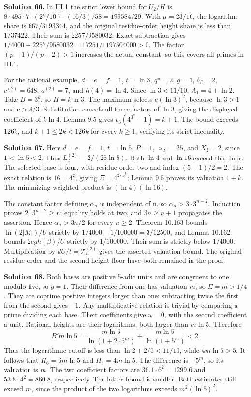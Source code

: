 \documentclass[
  11pt,
  a4paper,
]{article}
\begin{document}
\textbf{Solution 66.} In III.1 the strict lower bound for \(U_2/H\) is
\(8\cdot495\cdot7\cdot(27/10)\cdot(16/3)/58
=199584/29\). With \(\mu=23/16\), the logarithm share is
\(667/3193344\), and the original residue-order height share is less
than \(1/37422\). Their sum is \(2257/9580032\). Exact subtraction gives
\(1/4000-2257/9580032=17251/1197504000>0\). The factor \((p-1)/(p-2)>1\)
increases the actual constant, so this covers all primes in III.1.

For the rational example, \(d=e=f=1\), \(t=\ln3\), \(q^u=2\), \(g=1\),
\(\delta_\beta=2\), \(c^{(2)}=648\), \(a^{(2)}=7\), and \(h(4)=\ln4\).
Since \(\ln3<11/10\), \(A_1=4+\ln2\). Take \(B=3^k\), so \(H=k\ln3\).
The maximum selects \(\mathrm e(\ln3)^2\), because \(\ln3>1\) and
\(\mathrm e>8/3\). Substitution cancels all three factors of \(\ln3\),
giving the displayed coefficient of \(k\ln4\). Lemma 9.5 gives
\(v_3(4^{3^k}-1)=k+1\). The bound exceeds \(126k\), and
\(k+1\le2k<126k\) for every \(k\ge1\), verifying its strict inequality.

\textbf{Solution 67.} Here \(d=e=f=1\), \(t=\ln5\), \(P=1\),
\(\varkappa_2=25\), and \(X_2=2\), since \(1<\ln5<2\). Thus
\(L_2^{(2)}=2/(25\ln5)\). Both \(\ln4\) and \(\ln16\) exceed this floor.
The selected base is four, with residue order two and index
\((5-1)/2=2\). The exact relation is \(16=4^2\), giving
\(\Xi=4^{2\cdot5^k}\); Lemma 9.5 proves its valuation \(1+k\). The
minimizing weighted product is \((\ln4)(\ln16)\).

The constant factor defining \(\alpha_n\) is independent of n, so
\(\alpha_n>3\cdot3^{n-2}\). Induction proves \(2\cdot3^{n-2}\ge n\):
equality holds at two, and \(3n\ge n+1\) propagates the assertion. Hence
\(\alpha_n>3n/2\) for every \(n\ge2\). Theorem 10.163 bounds
\(\ln(2|M|)/U\) strictly by \(1/4000-1/100000=3/12500\), and Lemma
10.162 bounds \(2eg h(\beta)/U\) strictly by \(1/100000\). Their sum is
strictly below \(1/4000\). Multiplication by \(dU/t=\mathcal T_n^{(2)}\)
gives the asserted valuation bound. The original residue order and the
second height floor have both remained in the proof.

\textbf{Solution 68.} Both bases are positive 5-adic units and are
congruent to one modulo five, so \(g=1\). Their difference from one has
valuation \(m\), so \(E=m>1/4\). They are coprime positive integers
larger than one: subtracting twice the first from the second gives
\(-1\). Any multiplicative relation is trivial by comparing a prime
dividing each base. Their coefficients give \(u=0\), with the second
coefficient a unit. Rational heights are their logarithms, both larger
than \(m\ln5\). Therefore \[
B' m\ln5
=\frac{m\ln5}{\ln(1+2\cdot5^m)}
+\frac{m\ln5}{\ln(1+5^m)}<2.
\] Thus the logarithmic cutoff is less than \(\ln2+2/5<11/10\), while
\(4m\ln5>5\). It follows that \(H_6=6m\ln5\) and \(H_4=4m\ln5\). The
difference is \(-5^m\), so its valuation is \(m\). The two coefficient
factors are \(36.1\cdot6^2=1299.6\) and \(53.8\cdot4^2=860.8\),
respectively. The latter bound is smaller. Both estimates still exceed
\(m\), since the product of the two logarithms exceeds \(m^2(\ln5)^2\).
\end{document}
